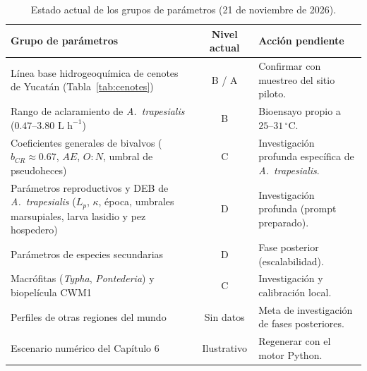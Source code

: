 \documentclass[11pt,letterpaper]{article}
\begin{document}
\begin{table}[htbp]
\centering
\caption{Estado actual de los grupos de parámetros (21 de noviembre de 2026).}
\label{tab:estado_param}
\vspace{0.15cm}
\small
\begin{tabularx}{\textwidth}{X c X}
\hline
\textbf{Grupo de parámetros} & \textbf{Nivel actual} & \textbf{Acción pendiente} \\
\hline
Línea base hidrogeoquímica de cenotes de Yucatán (Tabla~\ref{tab:cenotes}) & B / A & Confirmar con muestreo del sitio piloto. \\
Rango de aclaramiento de \textit{A.\ trapesialis} ($0.47\text{--}3.80\text{ L h}^{-1}$) & B & Bioensayo propio a $25\text{--}31\,^\circ\text{C}$. \\
Coeficientes generales de bivalvos ($b_{CR}\approx0.67$, $AE$, $O\!:\!N$, umbral de pseudoheces) & C & Investigación profunda específica de \textit{A.\ trapesialis}. \\
Parámetros reproductivos y DEB de \textit{A.\ trapesialis} ($L_p$, $\kappa$, época, umbrales marsupiales, larva lasidio y pez hospedero) & D & Investigación profunda (prompt preparado). \\
Parámetros de especies secundarias & D & Fase posterior (escalabilidad). \\
Macrófitas (\textit{Typha}, \textit{Pontederia}) y biopelícula CWM1 & C & Investigación y calibración local. \\
Perfiles de otras regiones del mundo & Sin datos & Meta de investigación de fases posteriores. \\
Escenario numérico del Capítulo 6 & Ilustrativo & Regenerar con el motor Python. \\
\hline
\end{tabularx}
\end{table}
\end{document}
